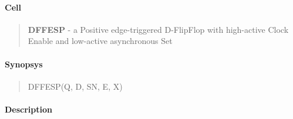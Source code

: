 \label{DFFESP}
\paragraph{Cell}
\begin{quote}
    \textbf{DFFESP} - a Positive edge-triggered D-FlipFlop with high-active Clock Enable and low-active asynchronous Set
\end{quote}

\paragraph{Synopsys}
\begin{quote}
    DFFESP(Q, D, SN, E, X)
\end{quote}

\paragraph{Description}

%


